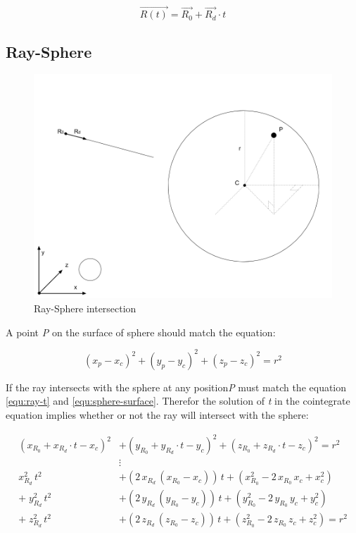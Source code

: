 \begin{equation}
\label{equ:ray-t}
\overrightarrow{R(t)} = \overrightarrow{R_0} + \overrightarrow{R_d} \cdot t
\end{equation}

\subsection{Ray-Sphere}

\begin{figure}[H]
\caption[ray-sphere-intersection]{Ray-Sphere intersection}
\label{fig:ray-sphere}
\centering
\includegraphics[width=\linewidth]{Figures/ray-sphere-intersection.png}
\decoRule
\end{figure}

A point \emph{P} on the surface of sphere should match the equation:

\begin{equation}
\label{equ:sphere-surface}
(x_p - x_c)^2 + (y_p - y_c)^2 + (z_p - z_c)^2 = r^2
\end{equation}

If the ray intersects with the sphere at any position\emph{P} must match the equation \ref{equ:ray-t} and \ref{equ:sphere-surface}. Therefor the solution of \emph{t} in the cointegrate equation implies whether or not the ray will intersect with the sphere:

\[
\begin{aligned}
(x_{R_0} + x_{R_d} \cdot t - x_c)^2 &+ (y_{R_0} + y_{R_d} \cdot t - y_c)^2 + (z_{R_0} + z_{R_d} \cdot t - z_c)^2 = r^2 \\
&\vdots \\
x_{R_d}^2\,t^2 &+ (2\,x_{R_d}\,(x_{R_0} - x_c))\,t + (x_{R_0}^2 - 2\,x_{R_0}\,x_c + x_c^2) \\
+\;y_{R_d}^2\,t^2 &+ (2\,y_{R_d}\,(y_{R_0} - y_c))\,t + (y_{R_0}^2 - 2\,y_{R_0}\,y_c + y_c^2) \\
+\;z_{R_d}^2\,t^2 &+ (2\,z_{R_d}\,(z_{R_0} - z_c))\,t + (z_{R_0}^2 - 2\,z_{R_0}\,z_c + z_c^2) = r^2
\end{aligned}
\]

